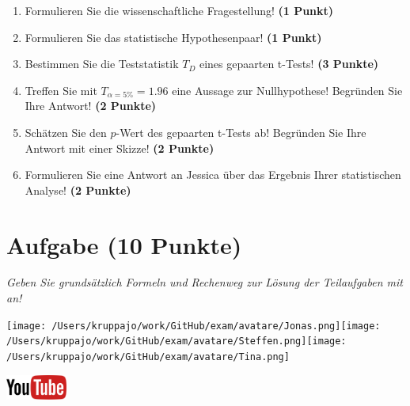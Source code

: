 \documentclass[a4paper, 9pt]{scrartcl}\usepackage[]{graphicx}\usepackage[]{xcolor}
\begin{document}
\begin{enumerate}
  \item Formulieren Sie die wissenschaftliche Fragestellung! \textbf{(1 Punkt)}
  \item Formulieren Sie das statistische Hypothesenpaar! \textbf{(1 Punkt)}
  \item Bestimmen Sie die Teststatistik $T_{D}$ eines gepaarten t-Tests! \textbf{(3 Punkte)}
  \item Treffen Sie mit $T_{\alpha = 5\%} = 1.96$ eine Aussage zur Nullhypothese! Begründen Sie Ihre Antwort! \textbf{(2 Punkte)}
\item Schätzen Sie den $p$-Wert des gepaarten t-Tests ab! Begründen Sie Ihre Antwort mit einer Skizze! \textbf{(2 Punkte)}
\item Formulieren Sie eine Antwort an Jessica über das Ergebnis Ihrer statistischen Analyse! \textbf{(2 Punkte)}
\end{enumerate}


 
\clearpage

\section{Aufgabe \hfill (10 Punkte)}

\textit{Geben Sie grundsätzlich Formeln und Rechenweg zur Lösung der Teilaufgaben mit an!} \\[1Ex]
 

 
\begin{minipage}[t]{0.5\textwidth}
\texttt{[image: /Users/kruppajo/work/GitHub/exam/avatare/Jonas.png]}\hspace{-4mm}\texttt{[image: /Users/kruppajo/work/GitHub/exam/avatare/Steffen.png]}\hspace{-4mm}\texttt{[image: /Users/kruppajo/work/GitHub/exam/avatare/Tina.png]}
\end{minipage}
\begin{minipage}[t]{0.5\textwidth}
\hfill
\href{https://youtu.be/exDo7AyHl4Q}{\includegraphics[width = 2cm]{img/youtube}}
\end{minipage}
\vspace{1ex}
\end{document}
